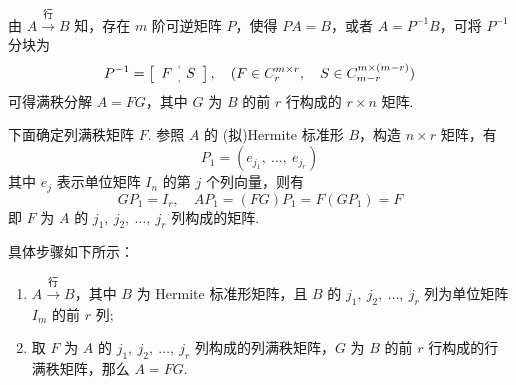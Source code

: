             \par 由 $A \stackrel{\text{行}}{\longrightarrow} B$ 知，存在 $m$ 阶可逆矩阵 $P$，使得 $PA = B$，或者 $A = P^{-1}B$，可将 $P^{-1}$ 分块为
            \begin{equation*}
                P^{-1} = \left[\begin{array}{c:c}
                    F & S
                \end{array}\right], \quad (F \in C_r^{m \times r}, \quad S \in C_{m-r}^{m \times (m-r)})
            \end{equation*}
            可得满秩分解 $A = FG$，其中 $G$ 为 $B$ 的前 $r$ 行构成的 $r \times n$ 矩阵.
            \par 下面确定列满秩矩阵 $F$. 参照 $A$ 的 (拟)Hermite 标准形 $B$，构造 $n \times r$ 矩阵，有
            \begin{equation*}
                P_1 = (e_{j_1}, \ \dots, \ e_{j_r})
            \end{equation*}
            其中 $e_j$ 表示单位矩阵 $I_n$ 的第 $j$ 个列向量，则有
            \begin{equation*}
                GP_1 = I_r, \quad AP_1 = (FG)P_1 = F(GP_1) = F
            \end{equation*}
            即 $F$ 为 $A$ 的 $j_1, \ j_2, \ \dots, \ j_r$ 列构成的矩阵.
            \par 具体步骤如下所示：
            \begin{enumerate}
                \item $A \stackrel{\text{行}}{\longrightarrow} B$，其中 $B$ 为 Hermite 标准形矩阵，且 $B$ 的 $j_1, \ j_2, \ \dots, \ j_r$ 列为单位矩阵 $I_m$ 的前 $r$ 列;
                \item 取 $F$ 为 $A$ 的 $j_1, \ j_2, \ \dots, \ j_r$ 列构成的列满秩矩阵，$G$ 为 $B$ 的前 $r$ 行构成的行满秩矩阵，那么 $A = FG$.
            \end{enumerate}


